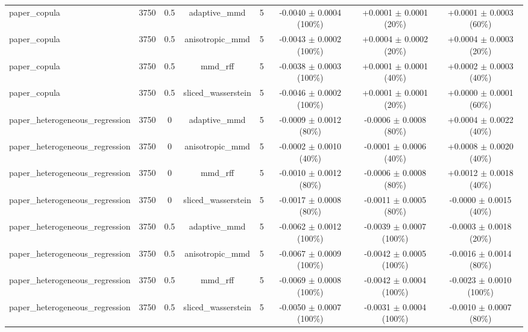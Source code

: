 \begin{table}[h]
\begin{adjustbox}{max width=\textwidth}
\begin{tabular}{lccccccc}
    paper\_copula & 3750 & 0.5 & adaptive\_mmd & 5 & -0.0040 $\pm$ 0.0004 (100\%) & +0.0001 $\pm$ 0.0001 (20\%) & +0.0001 $\pm$ 0.0003 (60\%) \\
    paper\_copula & 3750 & 0.5 & anisotropic\_mmd & 5 & -0.0043 $\pm$ 0.0002 (100\%) & +0.0004 $\pm$ 0.0002 (20\%) & +0.0004 $\pm$ 0.0003 (20\%) \\
    paper\_copula & 3750 & 0.5 & mmd\_rff & 5 & -0.0038 $\pm$ 0.0003 (100\%) & +0.0001 $\pm$ 0.0001 (40\%) & +0.0002 $\pm$ 0.0003 (40\%) \\
    paper\_copula & 3750 & 0.5 & sliced\_wasserstein & 5 & -0.0046 $\pm$ 0.0002 (100\%) & +0.0001 $\pm$ 0.0001 (20\%) & +0.0000 $\pm$ 0.0001 (60\%) \\
    paper\_heterogeneous\_regression & 3750 & 0 & adaptive\_mmd & 5 & -0.0009 $\pm$ 0.0012 (80\%) & -0.0006 $\pm$ 0.0008 (80\%) & +0.0004 $\pm$ 0.0022 (40\%) \\
    paper\_heterogeneous\_regression & 3750 & 0 & anisotropic\_mmd & 5 & -0.0002 $\pm$ 0.0010 (40\%) & -0.0001 $\pm$ 0.0006 (40\%) & +0.0008 $\pm$ 0.0020 (40\%) \\
    paper\_heterogeneous\_regression & 3750 & 0 & mmd\_rff & 5 & -0.0010 $\pm$ 0.0012 (80\%) & -0.0006 $\pm$ 0.0008 (80\%) & +0.0012 $\pm$ 0.0018 (40\%) \\
    paper\_heterogeneous\_regression & 3750 & 0 & sliced\_wasserstein & 5 & -0.0017 $\pm$ 0.0008 (80\%) & -0.0011 $\pm$ 0.0005 (80\%) & -0.0000 $\pm$ 0.0015 (40\%) \\
    paper\_heterogeneous\_regression & 3750 & 0.5 & adaptive\_mmd & 5 & -0.0062 $\pm$ 0.0012 (100\%) & -0.0039 $\pm$ 0.0007 (100\%) & -0.0003 $\pm$ 0.0018 (20\%) \\
    paper\_heterogeneous\_regression & 3750 & 0.5 & anisotropic\_mmd & 5 & -0.0067 $\pm$ 0.0009 (100\%) & -0.0042 $\pm$ 0.0005 (100\%) & -0.0016 $\pm$ 0.0014 (80\%) \\
    paper\_heterogeneous\_regression & 3750 & 0.5 & mmd\_rff & 5 & -0.0069 $\pm$ 0.0008 (100\%) & -0.0042 $\pm$ 0.0004 (100\%) & -0.0023 $\pm$ 0.0010 (100\%) \\
    paper\_heterogeneous\_regression & 3750 & 0.5 & sliced\_wasserstein & 5 & -0.0050 $\pm$ 0.0007 (100\%) & -0.0031 $\pm$ 0.0004 (100\%) & -0.0010 $\pm$ 0.0007 (80\%) \\
    \bottomrule
  \end{tabular}
  \end{adjustbox}
\end{table}
